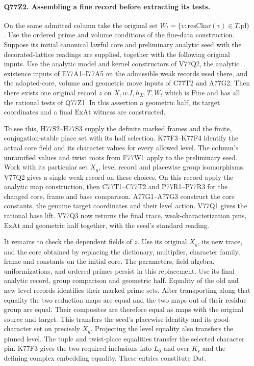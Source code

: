 \paragraph{Q77Z2. Assembling a fine record before extracting its tests.}
On the same admitted column take the original set
$W_t=\{v:\mathrm{resChar}(v)\in T.\mathrm{pl}\}$.
Use the ordered prime and volume conditions of the fine-data
construction. Suppose its initial canonical lawful core and
preliminary analytic seed with the decorated-lattice readings
are supplied, together with the following original inputs.
Use the analytic model and kernel constructors of V77Q2, the
analytic existence inputs of E77A1--I77A5 on the admissible
weak records used there, and the adapted-core, volume and
geometric move inputs of C77T2 and A77G2. Then there exists
one original record $z$ on $X,w.I,h_X,T,W_t$ which is
$\mathrm{Fine}$ and has all the rational tests of Q77Z1.
In this assertion a geometric half, its target coordinates and
a final $\mathrm{ExAt}$ witness are constructed.

To see this, H77S2--H77S3 supply the definite marked frames and
the finite, conjugation-stable place set with its half selection.
K77F3--K77F4 identify the actual core field and its character
values for every allowed level. The column's unramified values and
twist roots from F77W1 apply to the preliminary seed. Work with its
particular set $X_g$, level record and placewise group isomorphisms.
V77Q2 gives a single weak record on these choices. On this
record apply the analytic map construction, then C77T1--C77T2
and P77R1--P77R3 for the changed core, frame and base comparison.
A77G1--A77G3 construct the core constants, the genuine target
coordinates and their level action. V77Q1 gives the rational
base lift. V77Q3 now returns the final trace, weak-characterization
pins, $\mathrm{ExAt}$ and geometric half together, with the seed's
standard reading.

It remains to check the dependent fields of $z$. Use its original
$X_g$, its new trace, and the core obtained by replacing the
dictionary, multiplier, character family, frame and constants
on the initial core. The parameters, field algebra, uniformizations,
and ordered primes persist in this replacement. Use its final
analytic record, group comparison and geometric half. Equality of
the old and new level records identifies their marked prime sets.
After transporting along that equality the two reduction maps
are equal and the two maps out of their residue group are equal.
Their composites are therefore equal as maps with the original
source and target. This transfers the seed's placewise identity
and its good-character set on precisely $X_g$. Projecting the
level equality also transfers the pinned level. The tuple and
twist-place equalities transfer the selected character pin.
K77F3 gives the two required inclusions into $L_0$ and over $K_s$
and the defining complex embedding equality. These entries
constitute $\mathrm{Dat}$.

